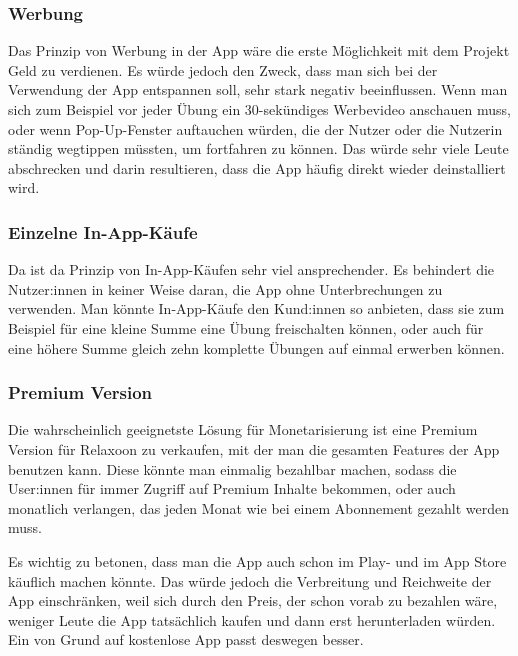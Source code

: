 \subsubsection{Werbung}

Das Prinzip von Werbung in der App wäre die erste Möglichkeit mit dem Projekt Geld zu verdienen. 
Es würde jedoch den Zweck, dass man sich bei der Verwendung der App entspannen soll, sehr stark negativ beeinflussen.
Wenn man sich zum Beispiel vor jeder Übung ein 30-sekündiges Werbevideo anschauen muss, oder wenn Pop-Up-Fenster 
auftauchen würden, die der Nutzer oder die Nutzerin ständig wegtippen müssten, um fortfahren zu können. Das würde
sehr viele Leute abschrecken und darin resultieren, dass die App häufig direkt wieder deinstalliert wird.

\subsubsection{Einzelne In-App-Käufe}

Da ist da Prinzip von In-App-Käufen sehr viel ansprechender. Es behindert die Nutzer:innen in keiner Weise daran,
die App ohne Unterbrechungen zu verwenden. Man könnte In-App-Käufe den Kund:innen so anbieten, dass sie zum
Beispiel für eine kleine Summe eine Übung freischalten können, oder auch für eine höhere Summe gleich zehn komplette
Übungen auf einmal erwerben können. 

\subsubsection{Premium Version}

Die wahrscheinlich geeignetste Lösung für Monetarisierung ist eine Premium Version für Relaxoon zu verkaufen, mit
der man die gesamten Features der App benutzen kann. Diese könnte man einmalig bezahlbar machen, sodass die User:innen
für immer Zugriff auf Premium Inhalte bekommen, oder auch 
monatlich verlangen, das jeden Monat wie bei einem Abonnement gezahlt werden muss.

\newpage

Es wichtig zu betonen, dass man die App auch schon im Play- und im App Store käuflich machen könnte. Das würde
jedoch die Verbreitung und Reichweite der App einschränken, weil sich durch den Preis, der schon vorab zu bezahlen
wäre, weniger Leute die App tatsächlich kaufen und dann erst herunterladen würden. Ein von Grund auf kostenlose
App passt deswegen besser.


